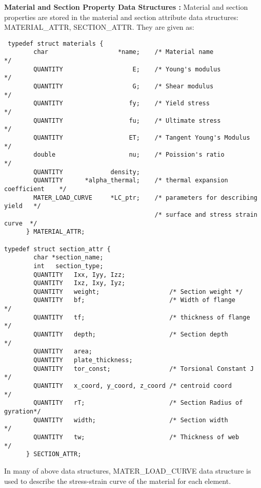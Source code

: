 \vspace{0.20 in}\noindent
{\bf Material and Section Property Data Structures :}
Material and section properties are stored in the material and section attribute data structures:
MATERIAL\_ATTR, SECTION\_ATTR. They are given as:

\begin{footnotesize}
\begin{verbatim}
 typedef struct materials {
        char                   *name;    /* Material name                    */
        QUANTITY                   E;    /* Young's modulus                  */
        QUANTITY                   G;    /* Shear modulus                    */
        QUANTITY                  fy;    /* Yield stress                     */
        QUANTITY                  fu;    /* Ultimate stress                  */
        QUANTITY                  ET;    /* Tangent Young's Modulus          */
        double                    nu;    /* Poission's ratio                 */
        QUANTITY             density;
        QUANTITY      *alpha_thermal;    /* thermal expansion coefficient    */
        MATER_LOAD_CURVE     *LC_ptr;    /* parameters for describing yield   */
                                         /* surface and stress strain curve  */
      } MATERIAL_ATTR;

typedef struct section_attr {
        char *section_name;
        int   section_type;
        QUANTITY   Ixx, Iyy, Izz;
        QUANTITY   Ixz, Ixy, Iyz;
        QUANTITY   weight;                   /* Section weight */
        QUANTITY   bf;                       /* Width of flange         */
        QUANTITY   tf;                       /* thickness of flange     */
        QUANTITY   depth;                    /* Section depth           */
        QUANTITY   area;
        QUANTITY   plate_thickness;
        QUANTITY   tor_const;                /* Torsional Constant J    */
        QUANTITY   x_coord, y_coord, z_coord /* centroid coord          */
        QUANTITY   rT;                       /* Section Radius of gyration*/
        QUANTITY   width;                    /* Section width           */
        QUANTITY   tw;                       /* Thickness of web        */
      } SECTION_ATTR;
\end{verbatim}
\end{footnotesize}

\vspace{0.05 in}\noindent
In many of above data structures,
MATER\_LOAD\_CURVE data structure is
used to describe the stress-strain
curve of the material for each element.


